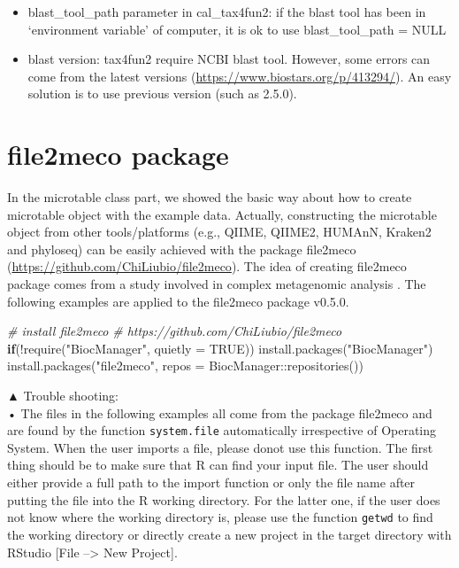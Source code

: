 \documentclass[
]{book}
\newenvironment{Shaded}{\begin{snugshade}}{\end{snugshade}}
\newcommand{\AttributeTok}[1]{\textcolor[rgb]{0.77,0.63,0.00}{#1}}
\newcommand{\CommentTok}[1]{\textcolor[rgb]{0.56,0.35,0.01}{\textit{#1}}}
\newcommand{\ConstantTok}[1]{\textcolor[rgb]{0.00,0.00,0.00}{#1}}
\newcommand{\ControlFlowTok}[1]{\textcolor[rgb]{0.13,0.29,0.53}{\textbf{#1}}}
\newcommand{\FunctionTok}[1]{\textcolor[rgb]{0.00,0.00,0.00}{#1}}
\newcommand{\NormalTok}[1]{#1}
\newcommand{\SpecialCharTok}[1]{\textcolor[rgb]{0.00,0.00,0.00}{#1}}
\newcommand{\StringTok}[1]{\textcolor[rgb]{0.31,0.60,0.02}{#1}}
\providecommand{\tightlist}{%
  \setlength{\itemsep}{0pt}\setlength{\parskip}{0pt}}
\begin{document}
\begin{itemize}
\tightlist
\item
  blast\_tool\_path parameter in cal\_tax4fun2: if the blast tool has been in `environment variable' of computer, it is ok to use blast\_tool\_path = NULL
\item
  blast version: tax4fun2 require NCBI blast tool. However, some errors can come from the latest versions (\url{https://www.biostars.org/p/413294/}). An easy solution is to use previous version (such as 2.5.0).
\end{itemize}

\hypertarget{file2meco-package}{%
\chapter{file2meco package}\label{file2meco-package}}

In the microtable class part, we showed the basic way about how to create microtable object with the example data.
Actually, constructing the microtable object from other tools/platforms (e.g., QIIME, QIIME2, HUMAnN, Kraken2 and phyloseq)
can be easily achieved with the package file2meco (\url{https://github.com/ChiLiubio/file2meco}).
The idea of creating file2meco package comes from a study involved in complex metagenomic analysis \citep{Liu_Microbial_2022}.
The following examples are applied to the file2meco package v0.5.0.

\begin{Shaded}
\begin{Highlighting}[]
\CommentTok{\# install file2meco}
\CommentTok{\# https://github.com/ChiLiubio/file2meco}
\ControlFlowTok{if}\NormalTok{(}\SpecialCharTok{!}\FunctionTok{require}\NormalTok{(}\StringTok{"BiocManager"}\NormalTok{, }\AttributeTok{quietly =} \ConstantTok{TRUE}\NormalTok{)) }\FunctionTok{install.packages}\NormalTok{(}\StringTok{"BiocManager"}\NormalTok{)}
\FunctionTok{install.packages}\NormalTok{(}\StringTok{"file2meco"}\NormalTok{, }\AttributeTok{repos =}\NormalTok{ BiocManager}\SpecialCharTok{::}\FunctionTok{repositories}\NormalTok{())}
\end{Highlighting}
\end{Shaded}

▲ Trouble shooting:\\
• The files in the following examples all come from the package file2meco and are found by the function \texttt{system.file} automatically irrespective of Operating System.
When the user imports a file, please donot use this function.
The first thing should be to make sure that R can find your input file.
The user should either provide a full path to the import function or only the file name after putting the file into the R working directory.
For the latter one, if the user does not know where the working directory is,
please use the function \texttt{getwd} to find the working directory or directly create a new project in the target directory with RStudio {[}File --\textgreater{} New Project{]}.
\end{document}
